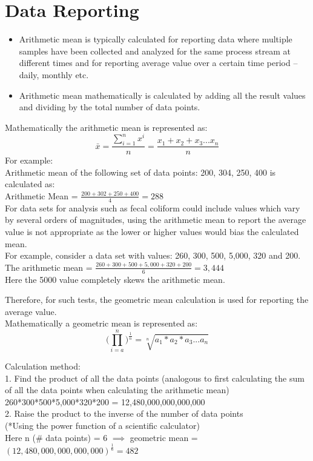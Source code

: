 \section{Data Reporting}	
		\begin{itemize}
			\item Arithmetic mean is typically calculated for reporting data where multiple samples have been collected and analyzed for the same process stream at different times and for reporting average value over a certain time period – daily, monthly etc.\\ \item Arithmetic mean mathematically is calculated by adding all the result values and dividing by the total number of data points.\\
		\end{itemize}
		Mathematically the arithmetic mean is represented as:\\
		$$\bar{x}=\frac{\sum_{i=1}^{n} x^i}{n} = \frac{x_1+x_2+x_3...x_n}{n}$$
		For example:\\
		Arithmetic mean of the following set of data points:  200, 304, 250, 400 is calculated as:\\
		\vspace{10pt}
		Arithmetic Mean = $\frac{200 + 302 + 250 + 400}{4}= 288$\\
		\vspace{10pt}
		For data sets for analysis such as fecal coliform could include values which vary by several orders of magnitudes, using the arithmetic mean to report the average value is not appropriate as the lower or higher values would bias the calculated mean.\\
		\vspace{10pt}
		For example, consider a data set with values:  260, 300, 500, 5,000, 320 and 200.\\
		\vspace{10pt}
		The arithmetic mean = $\frac{260+300+500+5,000+320+200}{6} = 3,444$\\
		Here the 5000 value completely skews the arithmetic mean.
		
		Therefore, for such tests, the geometric mean calculation is used for reporting the average value.\\
		
		
		Mathematically a geometric mean is represented as:\\
		$$\Bigg(\prod_{i=a}^n\Bigg)^{\frac{1}{n}}=\sqrt[n]{a_1*a_2*a_3...a_n}$$
		 
		Calculation method:\\
		1.	Find the product of all the data points (analogous to first calculating the sum of all the data points when calculating the arithmetic mean)\\
		260*300*500*5,000*320*200 = 12,480,000,000,000,000\\
		2.	Raise the product to the inverse of the number of data points\\
		(*Using the power function of a scientific calculator)\\
		Here n (\# data points) = 6 $\implies$ geometric mean = $(12,480,000,000,000,000)^{\frac{1}{6}}   = 482$

